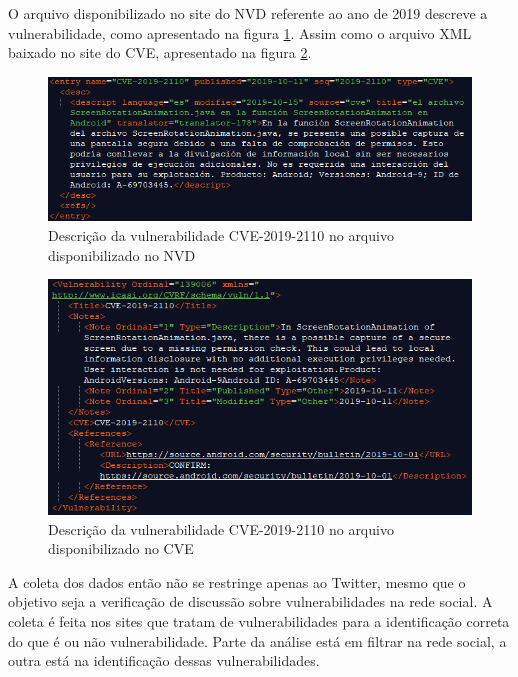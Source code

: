 O arquivo disponibilizado no site do NVD referente ao ano de 2019 descreve a vulnerabilidade, como apresentado na figura \ref{fig:descricaoVulnerabilidadeNVD}. Assim como o arquivo XML baixado no site do CVE, apresentado na figura \ref{fig:descricaoVulnerabilidadeCVE}.

\begin{figure}[H]
\centering
\includegraphics[width=1\textwidth]{imagens/descricaoVulnerabilidadeNVD.png}
\caption{Descrição da vulnerabilidade CVE-2019-2110 no arquivo disponibilizado no NVD}
\label{fig:descricaoVulnerabilidadeNVD}
\end{figure}

\begin{figure}[H]
\centering
\includegraphics[width=1\textwidth]{imagens/descricaoVulnerabilidadeCVE.png}
\caption{Descrição da vulnerabilidade CVE-2019-2110 no arquivo disponibilizado no CVE}
\label{fig:descricaoVulnerabilidadeCVE}
\end{figure}

A coleta dos dados então não se restringe apenas ao Twitter, mesmo que o objetivo seja a verificação de discussão sobre vulnerabilidades na rede social. A coleta é feita nos sites que tratam de vulnerabilidades para a identificação correta do que é ou não vulnerabilidade. Parte da análise está em filtrar na rede social, a outra está na identificação dessas vulnerabilidades.

